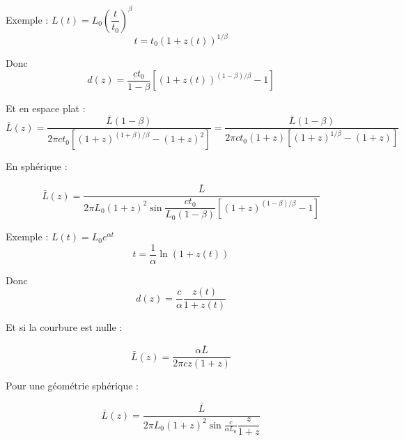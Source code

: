 \documentclass[11pt]{article} %
\begin{document}
Exemple : $L(t) = L_0 \left (\dfrac{t}{t_0} \right )  ^\beta$
\begin{equation}
t = t_0 \left (1+z(t) \right)^{1/\beta}
\end{equation}

Donc
\begin{equation}
d(z) = \dfrac{ct_0} {1-\beta} \left [ \left (1+z(t) \right)^{(1-\beta)/\beta} - 1 \right ]
\end{equation}

Et en espace plat :
\begin{equation}
\bar{L} (z) = \dfrac{\bar{L}(1-\beta)}{2\pi ct_0 \left [ (1+z)^{(1+\beta)/\beta}- (1+z)^2 \right ] } = \dfrac{\bar{L}(1-\beta)}{2\pi ct_0 \left(1+z \right ) \left [ (1+z)^{1/\beta}- (1+z) \right ] }
\end{equation}

En sphérique :

\begin{equation}
\bar{L} (z) = \dfrac{\bar{L}}{2\pi L_0 (1+z)^2 \sin\dfrac{ct_0} {L_0(1-\beta)} \left [ \left (1+z \right)^{(1-\beta)/\beta} - 1 \right ]}
\end{equation}

Exemple : $L(t) = L_0 e^{\alpha t}$
\begin{equation}
t = \dfrac{1}{\alpha} \ln {\left (1+z(t) \right )}
\end{equation}

Donc
\begin{equation}
d(z) = \dfrac{c}{\alpha} \dfrac{z(t)}{1+z(t)}
\end{equation}

Et si la courbure est nulle :

\begin{equation}
\bar{L} (z) = \dfrac{\alpha \bar{L}}{2\pi c z(1+z) }
\end{equation}

Pour une géométrie sphérique :

\begin{equation}
\bar{L} (z) = \dfrac{\bar{L}}{2\pi L_0(1+z)^2 \sin\frac{c}{\alpha L_0} \dfrac{z}{1+z}}
\end{equation}
\end{document}
